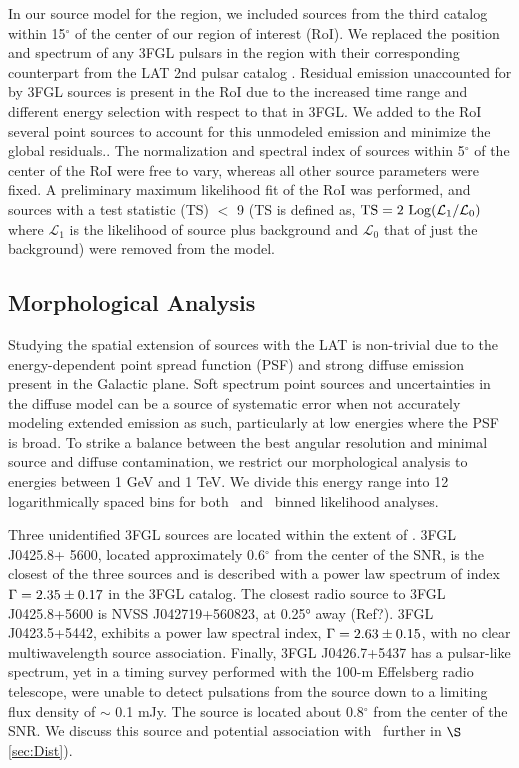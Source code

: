 In our source model for the region, we included sources from the third \FermiLat catalog \citep[3FGL]{3FGL} within 15$^\circ$ of the center of our region of interest (RoI). We replaced the position and spectrum of any 3FGL pulsars in the region with their corresponding counterpart  from the LAT 2nd pulsar catalog \citep{2PC}.  Residual emission unaccounted for by 3FGL sources is present in the RoI due to the increased time range and different energy selection with respect to that in 3FGL. We added to the RoI several point sources to account for this unmodeled emission and minimize the global residuals..  The normalization and spectral index of sources within 5$^{\circ}$ of the center of the RoI were free to vary, whereas all other source parameters were fixed. A preliminary maximum likelihood fit of the RoI was performed, and  sources with a test statistic (TS) $<$ 9 (TS is defined as,  ${\rm TS}=2~{\rm Log}(\mathcal{L}_1 / \mathcal{L}_0)$ where $\mathcal{L}_1$ 
is the likelihood of source plus background and  $\mathcal{L}_0$ that of just the background) were removed from the model. 

\subsection{\label{sec:LATmorph}Morphological Analysis}
Studying the spatial extension of sources with the LAT is non-trivial due to the energy-dependent point spread function (PSF) and strong diffuse emission present in the Galactic plane. Soft spectrum point sources and uncertainties in the diffuse model can be a source of systematic error when not accurately modeling extended emission as such, particularly at low energies where the PSF is broad. To strike a balance between the best angular resolution and minimal source and diffuse contamination, we restrict our morphological analysis to energies between 1 GeV and 1 TeV. We divide this energy range into 12 logarithmically spaced bins for both \ptlike~and \gtlike~binned likelihood analyses. 

Three  unidentified 3FGL sources are located within the extent of \Gone. 3FGL J0425.8+ 5600, located approximately 0.6$^\circ$ from the center of the SNR, is the closest of the three sources and is described with a power law spectrum of index ${\rm \Gamma = 2.35\pm 0.17}$  in the 3FGL catalog. The closest radio source to 3FGL J0425.8+5600 is NVSS J042719+560823, at 0.25° away (Ref?). 3FGL J0423.5+5442, exhibits a power law spectral index, ${\rm \Gamma = 2.63\pm 0.15}$, with no clear multiwavelength source association. Finally, 3FGL J0426.7+5437 has a pulsar-like spectrum, yet in a timing survey performed with the 100-m  Effelsberg radio telescope, \cite{Barr13} were unable to detect pulsations from the source down to a limiting flux density of $\sim$ 0.1 mJy. The source is located about 0.8$^{\circ}$ from the center of the SNR. We discuss this source and potential association with \Gone ~further in $\S$\ref{sec:Dist}). 

